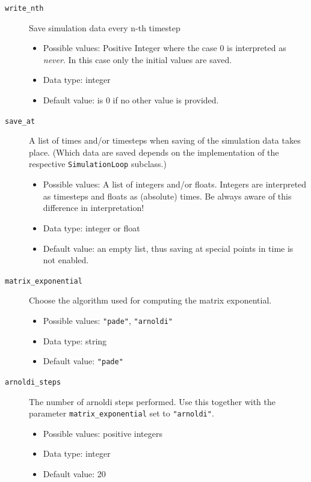 \documentclass[a4paper,10pt]{report}
\begin{document}
\begin{description}
  \item[\texttt{write\_nth}] Save simulation data every n-th timestep
  \begin{itemize}
    \item Possible values: Positive Integer where the case 0 is interpreted as
          \emph{never}. In this case only the initial values are saved.
    \item Data type: integer
    \item Default value: is 0 if no other value is provided.
  \end{itemize}

  \item[\texttt{save\_at}] A list of times and/or timesteps when saving of the
    simulation data takes place. (Which data are saved depends on the implementation
    of the respective \texttt{SimulationLoop} subclass.)
  \begin{itemize}
    \item Possible values: A list of integers and/or floats. Integers are interpreted
    as timesteps and floats as (absolute) times. Be always aware of this difference
    in interpretation!
    \item Data type: integer or float
    \item Default value: an empty list, thus saving at special points in time
    is not enabled.
  \end{itemize}

  \item[\texttt{matrix\_exponential}] Choose the algorithm used for computing the matrix exponential.
  \begin{itemize}
    \item Possible values: \texttt{"pade"}, \texttt{"arnoldi"}
    \item Data type: string
    \item Default value: \texttt{"pade"}
  \end{itemize}

  \item[\texttt{arnoldi\_steps}] The number of arnoldi steps performed. Use this together with
  the parameter \texttt{matrix\_exponential} set to \texttt{"arnoldi"}.
  \begin{itemize}
    \item Possible values: positive integers
    \item Data type: integer
    \item Default value: 20
  \end{itemize}
\end{description}
\end{document}
